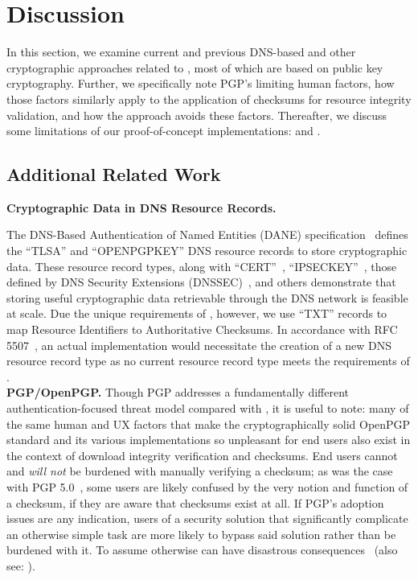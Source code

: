 \section{Discussion} \label{sec:discussion}

In this section, we examine current and previous DNS-based and other
cryptographic approaches related to \SYSTEM{}, most of which are based on public
key cryptography. Further, we specifically note PGP's limiting human factors,
how those factors similarly apply to the application of checksums for resource
integrity validation, and how the \SYSTEM{} approach avoids these factors.
Thereafter, we discuss some limitations of our proof-of-concept \SYSTEM{}
implementations: \DNSSYS{} and \DHTSYS{}.

\subsection{Additional Related Work}

\noindent\textbf{Cryptographic Data in DNS Resource Records.}

The DNS-Based Authentication of Named Entities (DANE) specification~\cite{DANE1,
DANE2, DANE3} defines the ``TLSA'' and ``OPENPGPKEY'' DNS resource records to
store cryptographic data. These resource record types, along with
``CERT''~\cite{CERT}, ``IPSECKEY''~\cite{IPSECKEY}, those defined by DNS
Security Extensions (DNSSEC)~\cite{DNSSEC}, and others demonstrate that storing
useful cryptographic data retrievable through the DNS network is feasible at
scale. Due the unique requirements of \SYSTEM{}, however, we use ``TXT'' records
to map Resource Identifiers to Authoritative Checksums. In accordance with RFC
5507~\cite{RFC5507}, an actual \SYSTEM{} implementation would necessitate the
creation of a new DNS resource record type as no current resource record type
meets the requirements of \SYSTEM{}. \\

\noindent\textbf{PGP/OpenPGP.} Though PGP addresses a fundamentally different
authentication-focused threat model compared with \SYSTEM{}, it is useful to
note: many of the same human and UX factors that make the cryptographically
solid OpenPGP standard and its various implementations so unpleasant for end
users also exist in the context of download integrity verification and
checksums. End users cannot and \textit{will not} be burdened with manually
verifying a checksum; as was the case with PGP 5.0~\cite{PGPBad}, some users are
likely confused by the very notion and function of a checksum, if they are aware
that checksums exist at all. If PGP's adoption issues are any indication, users
of a security solution that significantly complicate an otherwise simple task
are more likely to bypass said solution rather than be burdened with it. To
assume otherwise can have disastrous consequences~\cite{PGPBad} (also see:
). \\

